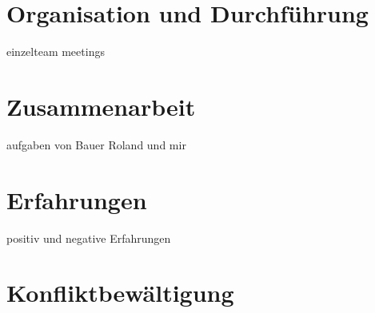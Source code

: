 \section{Organisation und Durchführung}

einzelteam
meetings


\section{Zusammenarbeit}
aufgaben von Bauer Roland und mir


\section{Erfahrungen}
positiv und negative Erfahrungen


\section{Konfliktbewältigung}